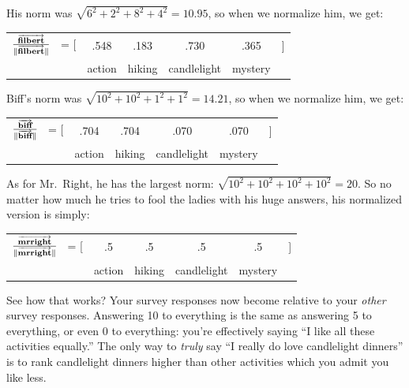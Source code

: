 His norm was $\sqrt{6^2+2^2+8^2+4^2}=10.95$, so when we normalize him, we get:

\begin{center}
\begin{tabular}{cccccc}
$\frac{\overrightarrow{\textbf{filbert}}}{\lVert\overrightarrow{\textbf{filbert}}\rVert}$
\quad \ = [ & .548 & .183 & .730 & .365 & ] \\
& \scriptsize{action} & \scriptsize{hiking} & \scriptsize{candlelight} &
\scriptsize{mystery} & \medskip \\
\end{tabular}
\end{center}
\vspace{-.15in}

Biff's norm was $\sqrt{10^2+10^2+1^2+1^2}=14.21$, so when we normalize him, we get:

\begin{center}
\begin{tabular}{cccccc}
$\frac{\overrightarrow{\textbf{biff}}}{\lVert\overrightarrow{\textbf{biff}}\rVert}$
\quad \ = [ & .704 & .704 & .070 & .070 & ] \\
& \scriptsize{action} & \scriptsize{hiking} & \scriptsize{candlelight} &
\scriptsize{mystery} & \medskip \\
\end{tabular}
\end{center}
\vspace{-.15in}

As for Mr.~Right, he has the largest norm: $\sqrt{10^2+10^2+10^2+10^2}=20$. So
no matter how much he tries to fool the ladies with his huge answers, his
normalized version is simply:

\begin{center}
\begin{tabular}{cccccc}
$\frac{\overrightarrow{\textbf{mrright}}}{\lVert\overrightarrow{\textbf{mrright}}\rVert}$
\quad \ = [ & .5 & .5 & .5 & .5 & ] \\
& \scriptsize{action} & \scriptsize{hiking} & \scriptsize{candlelight} &
\scriptsize{mystery} & \medskip \\
\end{tabular}
\end{center}
\vspace{-.15in}

See how that works? Your survey responses now become relative to your
\textit{other} survey responses. Answering 10 to everything is the
same as answering 5 to everything, or even 0 to everything: you're effectively
saying ``I like all these activities equally.'' The only way to \textit{truly}
say ``I really do love candlelight dinners'' is to rank candlelight dinners
higher than other activities which you admit you like less.

